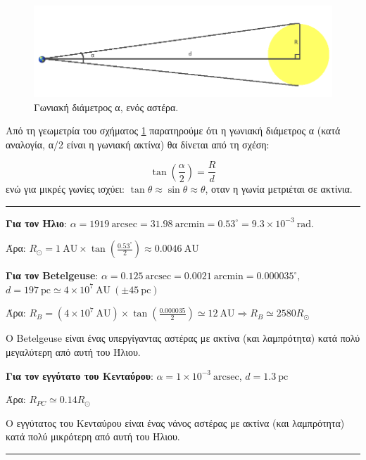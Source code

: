 \begin{figure}[h]
    \centering
    \includegraphics[scale=0.4]{Figures/angular_diameter.png}
    \caption{Γωνιακή διάμετρος α, ενός αστέρα. }
    \label{fig:angular_diameter}
\end{figure}

Από τη γεωμετρία του σχήματος \ref{fig:angular_diameter} παρατηρούμε ότι η γωνιακή διάμετρος α (κατά αναλογία, α/2 είναι η γωνιακή ακτίνα) θα δίνεται από τη σχέση:

\begin{equation}
    \label{eq:angular_diameter}
    \tan \left( \frac{\alpha}{2} \right) = \frac{R}{d}
\end{equation}
ενώ για μικρές γωνίες ισχύει: $\tan \theta \approx \sin \theta \approx \theta$, οταν η γωνία μετριέται σε ακτίνια.
\\

{\color{red} \hrule}
\textbf{Για τον Ήλιο}: $\alpha = 1919 \ \text{arcsec} = 31.98 \ \text{arcmin} = 0.53^{\circ} = 9.3 \times 10^{-3} \ \text{rad}$.

Άρα: $R_\odot = 1 \ \text{AU} \times \tan \left( \frac{0.53^{\circ}}{2}\right) \approx 0.0046 \ \text{AU}$

\textbf{Για τον Betelgeuse}: $\alpha = 0.125 \ \text{arcsec} = 0.0021 \ \text{arcmin} = 0.000035^{\circ}$, \\ $d=197 \ \text{pc} \simeq 4 \times 10^7 \ \text{AU} \ (\pm 45 \ \text{pc})$

Άρα: $R_B = (4 \times 10^7 \ \text{AU}) \times \tan \left( \frac{0.000035}{2} \right) \simeq 12 \ \text{AU} \Rightarrow R_B \simeq 2580 R_\odot$

O Betelgeuse είναι ένας υπεργίγαντας αστέρας με ακτίνα (και λαμπρότητα) κατά πολύ μεγαλύτερη από αυτή του Ήλιου.

\textbf{Για τον εγγύτατο του Κενταύρου}: $\alpha = 1 \times 10^{-3} \ \text{arcsec}$, $d = 1.3 \ \text{pc}$

Άρα: $R_{PC} \simeq 0.14 R_{\odot}$

Ο εγγύτατος του Κενταύρου είναι ένας νάνος αστέρας με ακτίνα (και λαμπρότητα) κατά πολύ μικρότερη από αυτή του Ήλιου.
{\color{red} \hrule}

